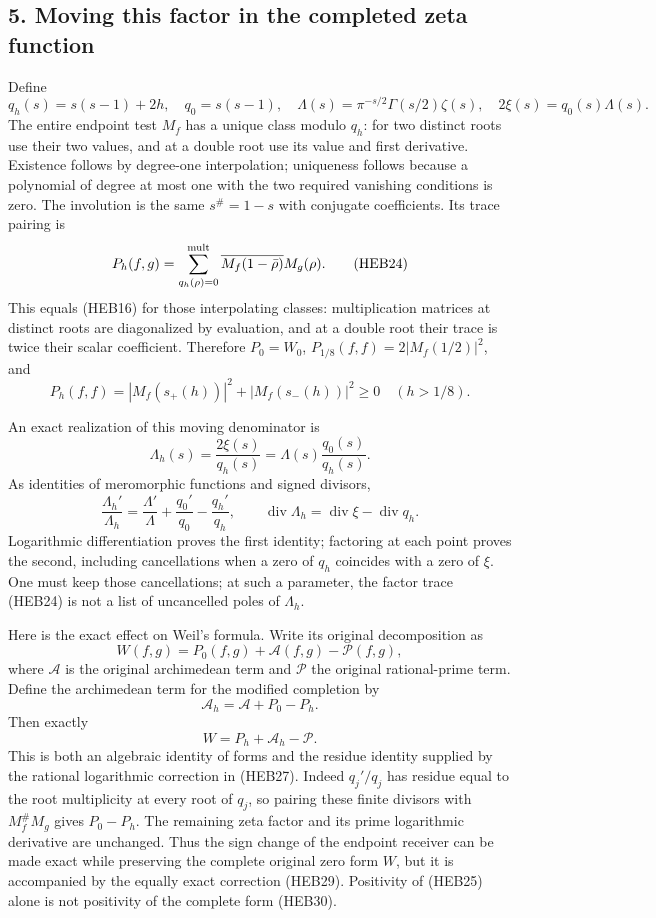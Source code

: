 \documentclass[
  10pt,
  a4paper,
]{article}
\begin{document}
\subsection{5. Moving this factor in the completed zeta
function}\label{moving-this-factor-in-the-completed-zeta-function}

Define \[
q_h(s)=s(s-1)+2h,\quad q_0=s(s-1),\quad
\Lambda(s)=\pi^{-s/2}\Gamma(s/2)\zeta(s),\quad
2\xi(s)=q_0(s)\Lambda(s).
\tag{HEB23}
\] The entire endpoint test \(M_f\) has a unique class modulo \(q_h\):
for two distinct roots use their two values, and at a double root use
its value and first derivative. Existence follows by degree-one
interpolation; uniqueness follows because a polynomial of degree at most
one with the two required vanishing conditions is zero. The involution
is the same \(s^\#=1-s\) with conjugate coefficients. Its trace pairing
is \[
P_h(f,g)=\sum_{q_h(\rho)=0}^{\rm mult}
\overline{M_f(1-\bar\rho)}M_g(\rho).
\tag{HEB24}
\] This equals (HEB16) for those interpolating classes: multiplication
matrices at distinct roots are diagonalized by evaluation, and at a
double root their trace is twice their scalar coefficient. Therefore
\(P_0=W_0\), \(P_{1/8}(f,f)=2|M_f(1/2)|^2\), and \[
P_h(f,f)=|M_f(s_+(h))|^2+|M_f(s_-(h))|^2\ge0
\quad(h>1/8).
\tag{HEB25}
\]

An exact realization of this moving denominator is \[
\Lambda_h(s)=\frac{2\xi(s)}{q_h(s)}
=\Lambda(s)\frac{q_0(s)}{q_h(s)}.
\tag{HEB26}
\] As identities of meromorphic functions and signed divisors, \[
\frac{\Lambda_h'}{\Lambda_h}
=\frac{\Lambda'}{\Lambda}+\frac{q_0'}{q_0}-\frac{q_h'}{q_h},
\qquad
\operatorname{div}\Lambda_h=\operatorname{div}\xi-\operatorname{div}q_h.
\tag{HEB27}
\] Logarithmic differentiation proves the first identity; factoring at
each point proves the second, including cancellations when a zero of
\(q_h\) coincides with a zero of \(\xi\). One must keep those
cancellations; at such a parameter, the factor trace (HEB24) is not a
list of uncancelled poles of \(\Lambda_h\).

Here is the exact effect on Weil's formula. Write its original
decomposition as \[
W(f,g)=P_0(f,g)+\mathcal A(f,g)-\mathcal P(f,g),
\tag{HEB28}
\] where \(\mathcal A\) is the original archimedean term and
\(\mathcal P\) the original rational-prime term. Define the archimedean
term for the modified completion by \[
\mathcal A_h=\mathcal A+P_0-P_h.
\tag{HEB29}
\] Then exactly \[
W=P_h+\mathcal A_h-\mathcal P.
\tag{HEB30}
\] This is both an algebraic identity of forms and the residue identity
supplied by the rational logarithmic correction in (HEB27). Indeed
\(q_j'/q_j\) has residue equal to the root multiplicity at every root of
\(q_j\), so pairing these finite divisors with \(M_f^\#M_g\) gives
\(P_0-P_h\). The remaining zeta factor and its prime logarithmic
derivative are unchanged. Thus the sign change of the endpoint receiver
can be made exact while preserving the complete original zero form
\(W\), but it is accompanied by the equally exact correction (HEB29).
Positivity of (HEB25) alone is not positivity of the complete form
(HEB30).
\end{document}
